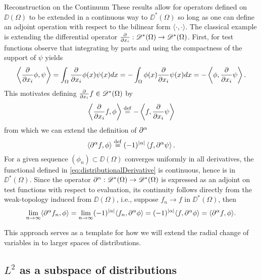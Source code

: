 \begin{chapter}{Reconstruction on the Continuum}
These results allow for operators defined on $\DD(\Omega)$ to be extended in a continuous way to $\DD^*(\Omega)$ so long as one can define an adjoint operation with respect to the bilinear form $\langle \cdot,\cdot \rangle$.
The classical example is extending the differential operator $\frac{\partial}{\partial x_i}:\mathscr D^*(\Omega) \to \mathscr D^*(\Omega)$. 
First, for test functions observe that integrating by parts and using the compactness of the support of $\psi$ yields
\begin{equation}
  \left\langle \frac{\partial}{\partial x_i} \phi,\psi \right\rangle = \int_{\Omega} \frac{\partial}{\partial x_i} \phi(x) \psi(x) dx = - \int_{\Omega}\phi(x) \frac{\partial}{\partial x_i} \psi(x)dx =- \left\langle \phi, \frac{\partial}{\partial x_i} \psi\right\rangle.
\end{equation}
This motivates defining $\frac{\partial}{\partial x_i} f \in \mathscr D^*(\Omega)$ by
\begin{equation}
  \left\langle \frac{\partial}{\partial x_i} f, \phi \right\rangle 
    \stackrel{\rm def}{=}  - \left\langle f, \frac{\partial}{\partial x_i} \psi\right\rangle
\end{equation}
from which we can extend the definition of $\partial^\alpha$
\begin{equation}\label{eq:distributionalDerivative}
  \left\langle \partial^\alpha f, \phi \right\rangle 
    \stackrel{\rm def}{=}  (-1)^{|\alpha|} \left\langle f, \partial^\alpha \psi\right\rangle.
\end{equation}
For a given sequence $(\phi_n)\subset \DD(\Omega)$ converges uniformly in all derivatives, the functional defined in \eqref{eq:distributionalDerivative} is continuous, hence is in $\DD^*(\Omega)$.
Since the operator $\partial^\alpha:\mathscr D^*(\Omega)\to\mathscr D^*(\Omega)$ is expressed as an adjoint on test functions with respect to evaluation, its continuity follows directly from the weak-topology induced from $\DD(\Omega)$, i.e., suppose $f_n \to f$ in $\DD^*(\Omega)$, then
\begin{align}
  \lim_{n\to \infty}\langle \partial^{\alpha}f_n, \phi\rangle 
  = \lim_{n\to\infty}(-1)^{|\alpha|} \langle f_n,\partial^{\alpha}\phi\rangle
  = (-1)^{|\alpha|} \langle f,\partial^{\alpha}\phi\rangle
  = \langle \partial^{\alpha}f, \phi\rangle.
\end{align}

This approach serves as a template for how we will extend the radial change of variables in  to larger spaces of distributions.

\subsection{$L^2$ as a subspace of distributions}


\end{chapter}
